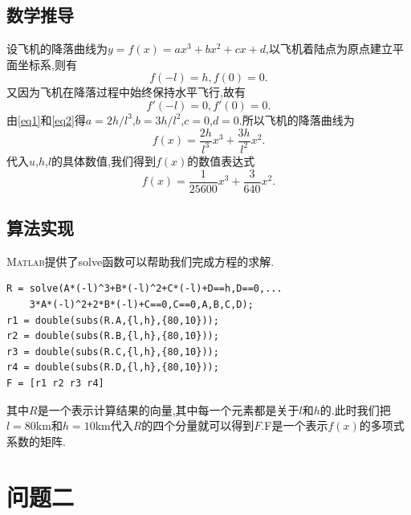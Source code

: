 \documentclass[a4paper,12pt]{article}
\begin{document}
\begin{CJK*}{UTF8}{gbsn}
\subsection{数学推导}
设飞机的降落曲线为$y=f(x)=ax^3+bx^2+cx+d$,以飞机着陆点为原点建立平面坐标系,则有
\begin{equation}
f(-l)=h,f(0)=0. \label{eq1}
\end{equation}
又因为飞机在降落过程中始终保持水平飞行,故有
\begin{equation}
f'(-l)=0,f'(0)=0. \label{eq2}
\end{equation}
由\eqref{eq1}和\eqref{eq2}得$a=2h/l^3$,$b=3h/l^2$,$c=0$,$d=0$.所以飞机的降落曲线为
\begin{equation}
f(x)=\frac{2h}{l^3}x^3+\frac{3h}{l^2}x^2. \label{eq3}
\end{equation}
代入$u$,$h$,$l$的具体数值,我们得到$f(x)$的数值表达式
\begin{equation*}
f(x)=\frac{1}{25600}x^3+\frac{3}{640}x^2.
\end{equation*}


\subsection{算法实现}
\textsc{Matlab}提供了solve函数可以帮助我们完成方程的求解.
\vspace{-11pt}
\begin{lstlisting}
R = solve(A*(-l)^3+B*(-l)^2+C*(-l)+D==h,D==0,...
    3*A*(-l)^2+2*B*(-l)+C==0,C==0,A,B,C,D);
r1 = double(subs(R.A,{l,h},{80,10}));
r2 = double(subs(R.B,{l,h},{80,10}));
r3 = double(subs(R.C,{l,h},{80,10}));
r4 = double(subs(R.D,{l,h},{80,10}));
F = [r1 r2 r3 r4]
\end{lstlisting}
\vspace{7pt}
\par 其中$R$是一个表示计算结果的向量,其中每一个元素都是关于$l$和$h$的.此时我们把$l=80$km和$h=10$km代入$R$的四个分量就可以得到$F$.F是一个表示$f(x)$的多项式系数的矩阵.
\section{问题二}



\end{CJK*}
\end{document}
